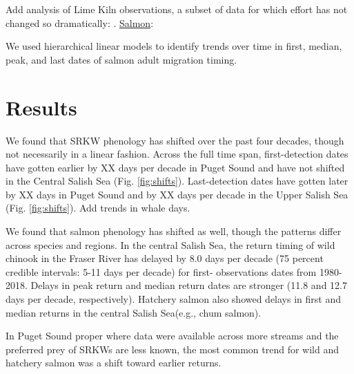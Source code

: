 \documentclass{article}
\begin{document}
\par Add analysis of Lime Kiln observations, a subset of data for which effort has not changed so dramatically: .
\underline{Salmon}:
\par We used hierarchical linear models to identify trends over time in first, median, peak, and last dates of salmon adult migration timing. 

\section*{Results}
\par We found that SRKW phenology has shifted over the past four decades, though not necessarily in a linear fashion. Across the full time span, first-detection dates have gotten earlier by XX days per decade in Puget Sound and have not shifted in the Central Salish Sea (Fig. \ref{fig:shifts}). 
Last-detection dates have gotten later by XX days in Puget Sound and by XX days per decade in the Upper Salish Sea (Fig. \ref{fig:shifts}). Add trends in whale days. %
\par We found that salmon phenology has shifted as well, though the patterns differ across species and regions. In the central Salish Sea, the return timing of wild chinook in the Fraser River has delayed by 8.0 days per decade (75 percent credible intervals: 5-11 days per decade) for first- observations dates from 1980-2018.  Delays in peak return and median return dates are stronger (11.8 and 12.7 days per decade, respectively). Hatchery salmon also showed delays in first and median returns in the central Salish Sea(e.g., chum salmon).
\par In Puget Sound proper where data were available across more streams and the preferred prey of SRKWs are less known, the most common trend for wild and hatchery salmon was a shift toward earlier returns.
\end{document}
